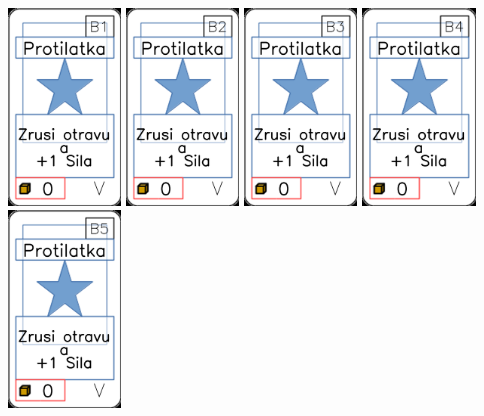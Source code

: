 \documentclass[a4paper]{article}
\begin{document}
	\includegraphics[width=3.0cm]{img-1_65}
	\includegraphics[width=3.0cm]{img-1_66}
	\includegraphics[width=3.0cm]{img-1_67}
	\includegraphics[width=3.0cm]{img-1_68}
	\includegraphics[width=3.0cm]{img-1_69}
\end{document}

